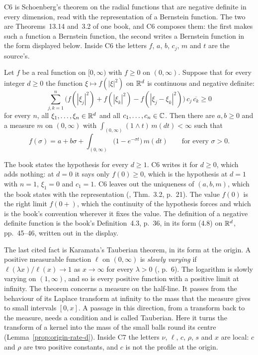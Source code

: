 C6 is Schoenberg's theorem on the radial functions that are negative definite in
every dimension, read with the representation of a Bernstein function. The two are Theorems~13.14
and~3.2 of one book, and C6 composes them: the first makes such a function a Bernstein function,
the second writes a Bernstein function in the form displayed below. Inside C6 the letters $f$, $a$,
$b$, $c_j$, $m$ and $t$ are the source's.

\begin{theorem}\label{thm:cited-A10}
Let $f$ be a real function on $[0,\infty)$ with $f \ge 0$ on $(0,\infty)$. Suppose that for every
integer $d \ge 0$ the function $\xi \mapsto f(|\xi|^2)$ on $\mathbb{R}^d$ is continuous and negative
definite:
\[
  \sum_{j,k=1}^n \bigl(f(|\xi_j|^2) + f(|\xi_k|^2) - f(|\xi_j - \xi_k|^2)\bigr)\,c_j\,\overline{c_k}
  \ge 0
\]
for every $n$, all $\xi_1, \dots, \xi_n \in \mathbb{R}^d$ and all $c_1, \dots, c_n \in \mathbb{C}$. Then there
are $a, b \ge 0$ and a measure $m$ on $(0,\infty)$ with $\int_{(0,\infty)}(1 \wedge t)\,m(dt) <
\infty$ such that
\[
  f(\sigma) = a + b\sigma + \int_{(0,\infty)} \bigl(1 - e^{-\sigma t}\bigr)\,m(dt)
  \qquad \text{for every } \sigma > 0 .
\]
\end{theorem}

The book states the hypothesis for every $d \ge 1$. C6 writes it for $d \ge 0$, which adds
nothing: at $d = 0$ it says only $f(0) \ge 0$, which is the hypothesis at $d = 1$ with $n = 1$,
$\xi_1 = 0$ and $c_1 = 1$. C6 leaves out the uniqueness of $(a, b, m)$, which the book states
with the representation (, Thm.~3.2, p.~21). The value $f(0)$ is
the right limit $f(0{+})$,
which the continuity of the hypothesis forces and which is the book's convention wherever it
fixes the value. The definition of a negative definite function is the book's Definition~4.3,
p.~36, in its form (4.8) on $\mathbb{R}^d$, pp.~45--46, written out in the display.

The last cited fact is Karamata's Tauberian theorem, in its form at the origin. A positive
measurable function $\ell$ on $(0,\infty)$ is \emph{slowly varying} if
$\ell(\lambda x)/\ell(x) \to 1$ as $x \to \infty$ for every $\lambda > 0$
(, p.~6). The logarithm is slowly varying on $(1,\infty)$, and so is
every positive function with a positive limit at infinity. The theorem
concerns a measure on the half-line. It passes from the behaviour of its Laplace transform at
infinity to the mass that the measure gives to small intervals $[0,x]$. A passage in this
direction, from a transform back to the measure, needs a condition and is called Tauberian. Here
it turns the transform of a kernel into the mass of the small balls round its centre
(Lemma~\ref{prop:origin-rate-d}). Inside C7 the letters
$\nu$, $\ell$, $c$, $\rho$, $s$ and $x$ are local: $c$ and $\rho$ are two positive constants, and
$c$ is not the profile at the origin.

